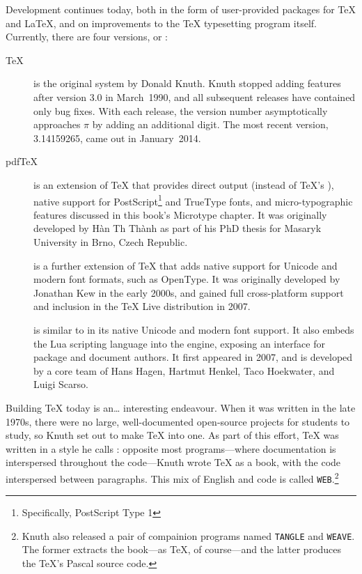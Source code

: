 Development continues today,
both in the form of user-provided packages for \TeX{} and \LaTeX{},
and on improvements to the \TeX{} typesetting program itself.
Currently, there are four versions, or :
\begin{description}
\item[\TeX] is the original system by Donald Knuth.
Knuth stopped adding features after version 3.0 in March~1990,
and all subsequent releases have contained only bug fixes.
With each release, the version number asymptotically approaches $\pi$
by adding an additional digit.
The most recent version, 3.14159265, came out in January~2014.

\item[pdf\TeX] is an extension of \TeX{} that provides direct 
    output (instead of \TeX's ),
    native support for PostScript\footnote{Specifically, PostScript Type 1}
    and TrueType fonts,
    and micro-typographic features discussed in this book's Microtype chapter.
    It was originally developed by
    Hàn Th\raisebox{0.2ex}{\,´} Thành
    as part of his PhD thesis
    for Masaryk University in Brno, Czech Republic.\punckern{}

\item[\XeTeX] is a further extension of \TeX{} that adds native support for
    Unicode and modern font formats, such as OpenType.
    It was originally developed by Jonathan Kew in the early 2000s,
    and gained full cross-platform support and inclusion in the \TeX{} Live
    distribution in 2007.\punckern{}

\item[\LuaTeX] is similar to \XeTeX{} in its native Unicode and modern font support.
    It also embeds the Lua scripting language into the engine,
    exposing an interface for package and document authors.
    It first appeared in 2007, and is developed by a core team of
    Hans Hagen, Hartmut Henkel, Taco Hoekwater,
    and Luigi Scarso.\punckern{}
\end{description}

Building \TeX{} today is an\ldots{} interesting endeavour.
When it was written in the late 1970s,
there were no large, well-documented open-source projects for students to study,
so Knuth set out to make \TeX{} into one.
As part of this effort, \TeX{} was written in a style he calls
: opposite most programs---where
documentation is interspersed throughout the code---Knuth wrote \TeX{} as a book,
with the code interspersed between paragraphs.
This mix of English and code is called \texttt{WEB}.\punckern\footnote{Knuth
also released a pair of compainion programs named
\texttt{TANGLE} and \texttt{WEAVE}.
The former extracts the book---as \TeX, of course---and the latter
produces the \TeX's Pascal source code.}

